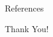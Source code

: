 \documentclass[aspectratio=169,xcolor=dvipsnames]{beamer}
\begin{document}



\begin{frame}{References} %
    \printbibliography
\end{frame}


\begin{frame}
    \Huge{\centerline{Thank You!}}
\end{frame}

\end{document}
